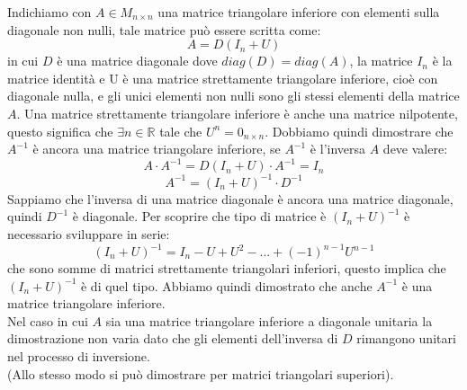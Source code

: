 \begin{flushleft}
Indichiamo con $A \in M_{n \times n}$ una matrice triangolare inferiore con elementi sulla diagonale non nulli, tale matrice può essere scritta come:
\[
A = D(I_n+U)
\]
in cui $D$ è una matrice diagonale dove $diag(D)=diag(A)$, la matrice $I_n$ è la matrice identità e U è una matrice strettamente triangolare inferiore, cioè con diagonale nulla, e gli unici elementi non nulli sono gli stessi elementi della matrice $A$. Una matrice strettamente triangolare inferiore è anche una matrice nilpotente, questo significa che $\exists n \in \mathbb{R}$ tale che $U^n = 0_{n \times n}$. Dobbiamo quindi dimostrare che $A^{-1}$ è ancora una matrice triangolare inferiore, se $A^{-1}$ è l'inversa $A$ deve valere:
\[
A\cdot A^{-1} = D(I_n+U) \cdot A^{-1} = I_n
\]
\[
A^{-1} = (I_n+U)^{-1} \cdot D^{-1}
\]
Sappiamo che l'inversa di una matrice diagonale è ancora una matrice diagonale, quindi $D^{-1}$ è diagonale. Per scoprire che tipo di matrice è $(I_n+U)^{-1}$ è necessario sviluppare in serie:
\[
(I_n+U)^{-1}=I_n-U+U^2-...+(-1)^{n-1}U^{n-1}
\]
che sono somme di matrici strettamente triangolari inferiori, questo implica che $(I_n+U)^{-1}$ è di quel tipo. Abbiamo quindi dimostrato che anche $A^{-1}$ è una matrice triangolare inferiore.
\\

Nel caso in cui $A$ sia una matrice triangolare inferiore a diagonale unitaria la dimostrazione non varia dato che gli elementi dell'inversa di $D$ rimangono unitari nel processo di inversione.\\

(Allo stesso modo si può dimostrare per matrici triangolari superiori).
\end{flushleft}